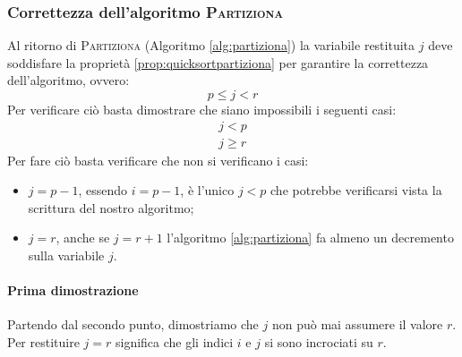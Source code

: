 \begin{center}

\end{center}

\subsubsection{Correttezza dell'algoritmo \textsc{Partiziona}}
Al ritorno  di \textsc{Partiziona} (Algoritmo \ref{alg:partiziona}) la variabile restituita $j$ deve soddisfare la proprietà \ref{prop:quicksortpartiziona} per garantire la correttezza dell'algoritmo, ovvero:
\begin{displaymath}
	p \leq j <r
\end{displaymath}
Per verificare ciò basta dimostrare che siano impossibili i seguenti casi:
\begin{eqnarray}
	j < p \\ \label{qsimp1}
	j \geq r  \label{qsimp2}
\end{eqnarray}
Per fare ciò basta verificare che non si verificano i casi:
\begin{itemize}
	\item $j=p-1$, essendo $i=p-1$, è l'unico $j<p$ che potrebbe verificarsi vista la scrittura del nostro algoritmo;
	\item $j=r$, anche se $j=r+1$ l'algoritmo \ref{alg:partiziona} fa almeno un decremento sulla variabile $j$.
\end{itemize}

\paragraph{Prima dimostrazione}
Partendo dal secondo punto, dimostriamo che $j$ non può mai assumere il valore $r$. Per restituire $j=r$ significa che gli indici $i$ e $j$ si sono incrociati su $r$.

